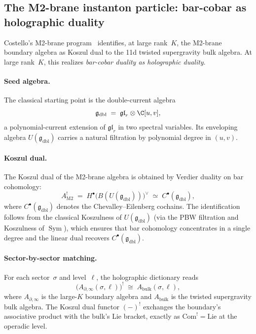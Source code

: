 \subsection{The M2-brane instanton particle: bar-cobar as holographic duality}
\label{subsec:M2-holography}

Costello's M2-brane program~\cite{Costello-1705.02500v1,costello-gaiotto}
identifies, at large rank~$K$, the M2-brane boundary algebra
as Koszul dual to the 11d twisted supergravity bulk algebra.
At large rank~$K$, this realizes \emph{bar-cobar duality as holographic duality}.

\paragraph{Seed algebra.}
The classical starting point is the double-current algebra
\[
 \mathfrak{g}_{\mathrm{dbl}}
 \;=\; \mathfrak{gl}_r \otimes \C[u,v],
\]
a polynomial-current extension of $\mathfrak{gl}_r$ in two spectral variables.
Its enveloping algebra $U(\mathfrak{g}_{\mathrm{dbl}})$ carries a natural
filtration by polynomial degree in $(u,v)$.

\paragraph{Koszul dual.}
The Koszul dual of the M2-brane algebra is obtained by Verdier duality on bar cohomology:
\[
 A^!_{\mathrm{M2}}
 \;=\; H^\bullet\bigl(B(U(\mathfrak{g}_{\mathrm{dbl}}))\bigr)^{\vee}
 \;\simeq\; C^\bullet(\mathfrak{g}_{\mathrm{dbl}}),
\]
where $C^\bullet(\mathfrak{g}_{\mathrm{dbl}})$ denotes the Chevalley--Eilenberg
cochains. The identification follows from the classical Koszulness of
$U(\mathfrak{g}_{\mathrm{dbl}})$ (via the PBW filtration and Koszulness of
$\operatorname{Sym}$), which ensures that bar cohomology concentrates in a single
degree and the linear dual recovers $C^\bullet(\mathfrak{g}_{\mathrm{dbl}})$.

\paragraph{Sector-by-sector matching.}
For each sector~$\sigma$ and level~$\ell$, the holographic dictionary reads
\[
 \bigl(A_{\partial,\infty}(\sigma,\ell)\bigr)^!
 \;\cong\;
 A_{\mathrm{bulk}}(\sigma,\ell),
\]
where $A_{\partial,\infty}$ is the large-$K$ boundary algebra and
$A_{\mathrm{bulk}}$ is the twisted supergravity bulk algebra.
The Koszul dual functor $(-)^!$ exchanges the boundary's associative
product with the bulk's Lie bracket, exactly as $\mathrm{Com}^!=\mathrm{Lie}$
at the operadic level.

